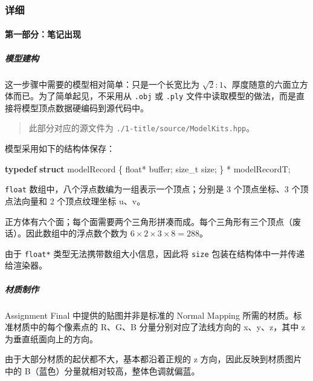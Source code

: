 \documentclass[
]{article}
\newenvironment{Shaded}{}{}
\newcommand{\DataTypeTok}[1]{\textcolor[rgb]{0.56,0.13,0.00}{#1}}
\newcommand{\KeywordTok}[1]{\textcolor[rgb]{0.00,0.44,0.13}{\textbf{#1}}}
\newcommand{\NormalTok}[1]{#1}
\begin{document}
\hypertarget{header-n99}{%
\subsubsection{详细}\label{header-n99}}

\hypertarget{header-n100}{%
\paragraph{第一部分：笔记出现}\label{header-n100}}

\hypertarget{header-n101}{%
\subparagraph{模型建构}\label{header-n101}}

这一步骤中需要的模型相对简单：只是一个长宽比为
\(\sqrt 2 : 1\)、厚度随意的六面立方体而已。为了简单起见，不采用从
\texttt{.obj} 或 \texttt{.ply}
文件中读取模型的做法，而是直接将模型顶点数据硬编码到源代码中。

\begin{quote}
此部分对应的源文件为 \texttt{./1-title/source/ModelKits.hpp}。
\end{quote}

模型采用如下的结构体保存：

\begin{Shaded}
\begin{Highlighting}[]
\KeywordTok{typedef} \KeywordTok{struct}\NormalTok{ modelRecord \{}
    \DataTypeTok{float}\NormalTok{* buffer;}
    \DataTypeTok{size_t}\NormalTok{ size;}
\NormalTok{\} * modelRecordT;}
\end{Highlighting}
\end{Shaded}

\texttt{float} 数组中，八个浮点数编为一组表示一个顶点；分别是 3
个顶点坐标、3 个顶点法向量和 2 个顶点纹理坐标 u、v。

正方体有六个面；每个面需要两个三角形拼凑而成。每个三角形有三个顶点（废话）。因此数组中的浮点数个数为
\(6 \times 2 \times 3 \times 8 = 288\)。

由于 \texttt{float*} 类型无法携带数组大小信息，因此将 \texttt{size}
包装在结构体中一并传递给渲染器。

\hypertarget{header-n110}{%
\subparagraph{材质制作}\label{header-n110}}

Assignment Final 中提供的贴图并非是标准的 Normal Mapping
所需的材质。标准材质中的每个像素点的 R、G、B 分量分别对应了法线方向的
x、y、z，其中 z 为垂直纸面向上的方向。

由于大部分材质的起伏都不大，基本都沿着正规的 z
方向，因此反映到材质图片中的 B（蓝色）分量就相对较高，整体色调就偏蓝。
\end{document}
